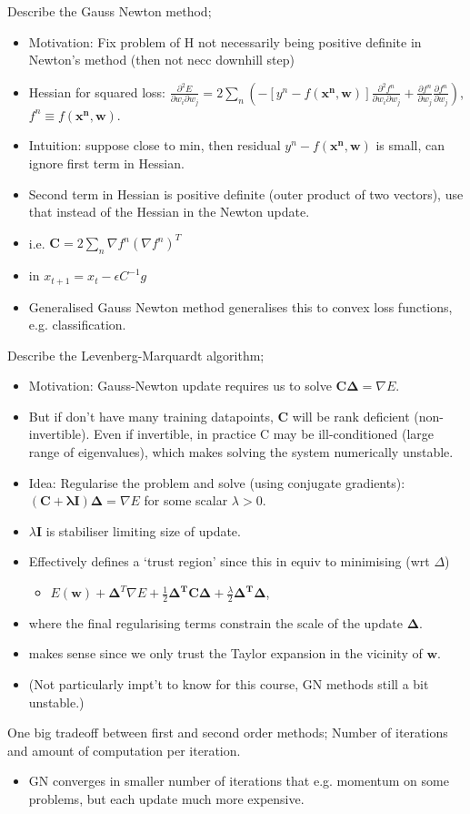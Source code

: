 \documentclass{article}
\begin{document}
Describe the Gauss Newton method; \begin{itemize} \item Motivation: Fix problem of H not necessarily being positive definite in Newton's method (then not necc downhill step) \item Hessian for squared loss: $\frac{\partial^2 E}{\partial w_i \partial w_j}=2\sum_n (-[y^n-f(\mathbf{x^n, w})]\frac{\partial ^2 f^n}{\partial w_i \partial w_j}+\frac{\partial f^n}{\partial w_j}\frac{\partial f^n}{\partial w_j})$, $f^n\equiv f(\mathbf{x^n, w})$.  \item Intuition: suppose close to min, then residual $y^n-f(\mathbf{x^n,w})$ is small, can ignore first term in Hessian.  \item Second term in Hessian is positive definite (outer product of two vectors), use that instead of the Hessian in the Newton update.  \item i.e. $\mathbf{C}=2\sum_n\nabla f^n(\nabla f^n)^T$ \item in $x_{t+1}=x_t - \epsilon C^{-1}g$ \item Generalised Gauss Newton method generalises this to convex loss functions, e.g. classification.  \end{itemize} 
            
Describe the Levenberg-Marquardt algorithm; \begin{itemize} \item Motivation: Gauss-Newton update requires us to solve $\mathbf{C\Delta} = \nabla E$.  \item But if don't have many training datapoints, $\mathbf{C}$ will be rank deficient (non-invertible). Even if invertible, in practice C may be ill-conditioned (large range of eigenvalues), which makes solving the system numerically unstable.  \item Idea: Regularise the problem and solve (using conjugate gradients): $(\mathbf{C+\lambda I})\mathbf{\Delta}=\nabla E$ for some scalar $\lambda > 0$.  \item $\lambda \mathbf{I}$ is stabiliser limiting size of update.  \item Effectively defines a `trust region' since this in equiv to minimising (wrt $\Delta$) \begin{itemize} \item $E(\mathbf{w}) + \mathbf{\Delta}^T\nabla E + \frac{1}{2}\mathbf{\Delta^TC\Delta} + \frac{\lambda}{2}\mathbf{\Delta^T\Delta}$, \end{itemize} \item where the final regularising terms constrain the scale of the update $\mathbf{\Delta}$.  \item makes sense since we only trust the Taylor expansion in the vicinity of $\mathbf{w}$.  \item (Not particularly impt't to know for this course, GN methods still a bit unstable.) \end{itemize}

One big tradeoff between first and second order methods; Number of iterations and amount of computation per iteration. \begin{itemize} \item GN converges in smaller number of iterations that e.g. momentum on some problems, but each update much more expensive.  \end{itemize}
\end{document}

